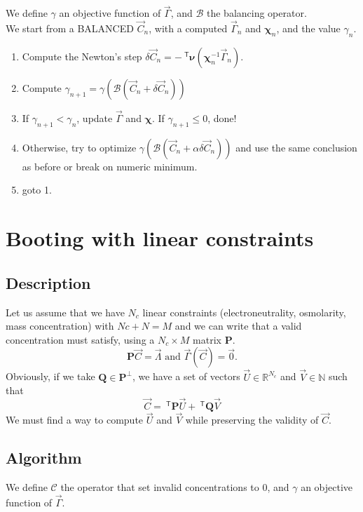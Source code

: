 \documentclass[aps]{revtex4}
\newcommand{\mymat}[1]{\bm{#1}}
\newcommand{\mytrn}[1]{~^{\mathsf{T}}{#1}}
\begin{document}
We define  $\gamma$ an
objective function of $\vec{\Gamma}$, and $\mathcal{B}$ the balancing operator.\\
We start from a BALANCED $\vec{C}_n$, with a computed $\vec{\Gamma}_n$ and $\mymat{\chi}_n$, and
the value $\gamma_n$.\\

\begin{enumerate}
\item Compute the Newton's step $\delta\vec{C}_n = - \mytrn{\mymat{\nu}}\left(\mymat{\chi}_n^{-1} \vec{\Gamma}_{n}\right)$.
\item Compute $\gamma_{n+1}=\gamma\left(\mathcal{B}\left(\vec{C}_n+\delta\vec{C}_n\right)\right)$
\item If $\gamma_{n+1}<\gamma_{n}$, update $\vec{\Gamma}$ and $\mymat{\chi}$. If $\gamma_{n+1}\leq 0$, done!
\item Otherwise, try to optimize $\gamma\left(\mathcal{B}\left(\vec{C}_n+\alpha\delta\vec{C}_n\right)\right)$ and use the same conclusion as before or break on numeric minimum.
\item goto 1.
\end{enumerate}


\section{Booting with linear constraints}
\subsection{Description}
Let us assume that we have $N_c$ linear constraints (electroneutrality, osmolarity, mass concentration) with $Nc+N=M$
and we can write that a valid concentration must satisfy, using a $N_c\times M$ matrix $\mymat{P}$. 
\begin{equation}
	\mymat{P} \vec{C} = \vec{\Lambda} \text{ and } \vec{\Gamma}\left(\vec{C}\right) = \vec{0}.
\end{equation}
Obviously, if we take $\mymat{Q}\in\mymat{P}^{\perp}$, we have a set of vectors $\vec{U}\in\mathbb{R}^{N_c}$ and $\vec{V}\in\mathbb{N}$ such that
\begin{equation}
	\vec{C} = \mytrn{\mymat{P}} \vec{U} + \mytrn{\mymat{Q}} \vec{V}
\end{equation}
We must find a way to compute $\vec{U}$ and $\vec{V}$ while preserving the validity of $\vec{C}$.

\subsection{Algorithm}
We define $\mathcal{C}$ the operator that set invalid concentrations to $0$, and $\gamma$ an
objective function of $\vec{\Gamma}$.
\end{document}
